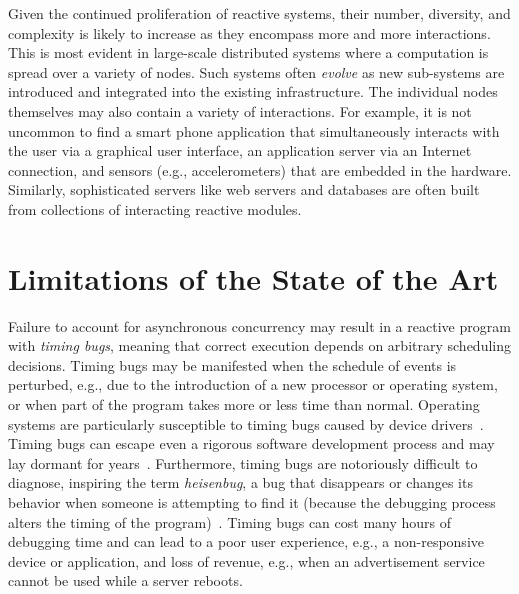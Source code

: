 Given the continued proliferation of reactive systems, their number, diversity, and complexity is likely to increase as they encompass more and more interactions.
This is most evident in large-scale distributed systems where a computation is spread over a variety of nodes.
Such systems often \emph{evolve} as new sub-systems are introduced and integrated into the existing infrastructure.
The individual nodes themselves may also contain a variety of interactions.
For example, it is not uncommon to find a smart phone application that simultaneously interacts with the user via a graphical user interface, an application server via an Internet connection, and sensors (e.g., accelerometers) that are embedded in the hardware.
Similarly, sophisticated servers like web servers and databases are often built from collections of interacting reactive modules.

\section{Limitations of the State of the Art}

Failure to account for asynchronous concurrency may result in a reactive program with \emph{timing bugs}, meaning that correct execution depends on arbitrary scheduling decisions.
Timing bugs may be manifested when the schedule of events is perturbed, e.g., due to the introduction of a new processor or operating system, or when part of the program takes more or less time than normal.
Operating systems are particularly susceptible to timing bugs caused by device drivers~\cite{ryzhyk2009dingo}.
Timing bugs can escape even a rigorous software development process and may lay dormant for years~\cite{lee2006problem}.
Furthermore, timing bugs are notoriously difficult to diagnose, inspiring the term \emph{heisenbug}, a bug that disappears or changes its behavior when someone is attempting to find it (because the debugging process alters the timing of the program)~\cite{1983proceedings}.
Timing bugs can cost many hours of debugging time and can lead to a poor user experience, e.g., a non-responsive device or application, and loss of revenue, e.g., when an advertisement service cannot be used while a server reboots.

